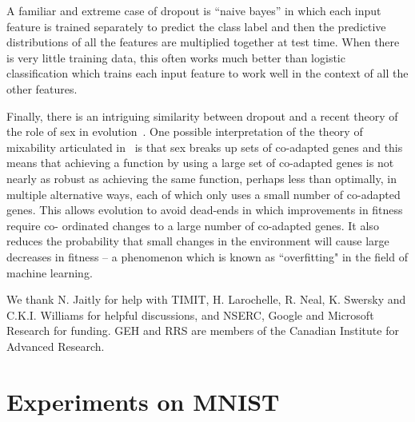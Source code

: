 \documentclass[12pt]{article}
\newcounter{lastnote}
\newenvironment{scilastnote}{\setcounter{lastnote}{\value{enumiv}}\addtocounter{lastnote}{+1}\begin{list}{\arabic{lastnote}.}
{\setlength{\leftmargin}{.22in}}
{\setlength{\labelsep}{.5em}}}
{\end{list}}
\begin{document}
A familiar and extreme case of dropout is ``naive bayes'' in which each input feature is
trained separately to predict the class label and then the predictive distributions of all
the features are multiplied together at test time. When there is very little training
data, this often works much better than logistic classification which trains each input
feature to work well in the context of all the other features.

Finally, there is an intriguing similarity between dropout and a recent theory
of the role of sex in evolution~\cite{Pap}.  One possible interpretation of the
theory of mixability articulated in~\cite{Pap} is that sex breaks up sets of
co-adapted genes and this means that achieving a function by using a large set
of co-adapted genes is not nearly as robust as achieving the same function,
perhaps less than optimally, in multiple alternative ways, each of which only
uses a small number of co-adapted genes. This allows evolution to avoid
dead-ends in which improvements in fitness require co- ordinated changes to a
large number of co-adapted genes. It also reduces the probability that small
changes in the environment will cause large decreases in fitness – a phenomenon
which is known as ``overfitting" in the field of machine learning.




\begin{scilastnote}
\item We thank N. Jaitly for help with TIMIT, H. Larochelle, R. Neal, K. Swersky and C.K.I. Williams for
helpful discussions, and NSERC, Google and Microsoft Research for
funding. GEH and RRS are members of the Canadian Institute for Advanced Research.
\end{scilastnote}
\appendix
\section{Experiments on MNIST}
\label{mnistsom}
\end{document}
